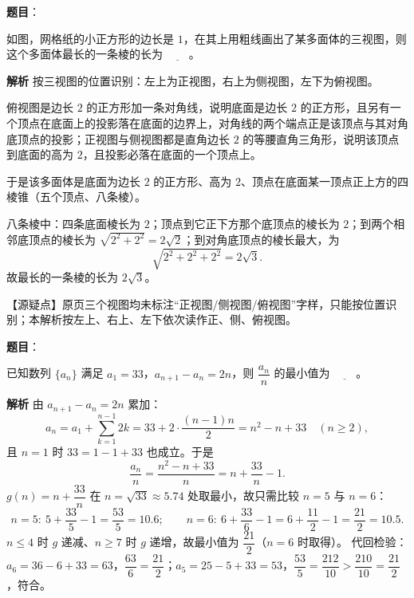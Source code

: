 \begin{answer}

\textbf{题目}：

如图，网格纸的小正方形的边长是 $1$，在其上用粗线画出了某多面体的三视图，则这个多面体最长的一条棱的长为 $\underline{\qquad}$。
\nopagebreak[4]
\begin{center}\end{center}
\nopagebreak[4]
\textbf{解析}
按三视图的位置识别：左上为正视图，右上为侧视图，左下为俯视图。

俯视图是边长 $2$ 的正方形加一条对角线，说明底面是边长 $2$ 的正方形，且另有一个顶点在底面上的投影落在底面的边界上，对角线的两个端点正是该顶点与其对角底顶点的投影；正视图与侧视图都是直角边长 $2$ 的等腰直角三角形，说明该顶点到底面的高为 $2$，且投影必落在底面的一个顶点上。

于是该多面体是底面为边长 $2$ 的正方形、高为 $2$、顶点在底面某一顶点正上方的四棱锥（五个顶点、八条棱）。

八条棱中：四条底面棱长为 $2$；顶点到它正下方那个底顶点的棱长为 $2$；到两个相邻底顶点的棱长为 $\sqrt{2^2+2^2}=2\sqrt2$；到对角底顶点的棱长最大，为
\nopagebreak[4]
\[\sqrt{2^2+2^2+2^2}=2\sqrt3.\]
故最长的一条棱的长为 $2\sqrt3$。

【源疑点】原页三个视图均未标注“正视图/侧视图/俯视图”字样，只能按位置识别；本解析按左上、右上、左下依次读作正、侧、俯视图。


\end{answer}
\begin{answer}

\textbf{题目}：

已知数列 $\{a_n\}$ 满足 $a_1=33$，$a_{n+1}-a_n=2n$，则 $\dfrac{a_n}{n}$ 的最小值为 $\underline{\qquad}$。

\textbf{解析}
由 $a_{n+1}-a_n=2n$ 累加：
\nopagebreak[4]
\[a_n=a_1+\sum_{k=1}^{n-1}2k=33+2\cdot\frac{(n-1)n}{2}=n^2-n+33\quad(n\geqslant2),\]
且 $n=1$ 时 $33=1-1+33$ 也成立。于是
\nopagebreak[4]
\[\frac{a_n}{n}=\frac{n^2-n+33}{n}=n+\frac{33}{n}-1.\]
$g(n)=n+\dfrac{33}{n}$ 在 $n=\sqrt{33}\approx5.74$ 处取最小，故只需比较 $n=5$ 与 $n=6$：
\nopagebreak[4]
\[n=5:\ 5+\frac{33}{5}-1=\frac{53}{5}=10.6;\qquad
n=6:\ 6+\frac{33}{6}-1=6+\frac{11}{2}-1=\frac{21}{2}=10.5.\]
$n\leqslant4$ 时 $g$ 递减、$n\geqslant7$ 时 $g$ 递增，故最小值为 $\dfrac{21}{2}$（$n=6$ 时取得）。
代回检验：$a_6=36-6+33=63$，$\dfrac{63}{6}=\dfrac{21}{2}$；$a_5=25-5+33=53$，$\dfrac{53}{5}=\dfrac{212}{10}>\dfrac{210}{10}=\dfrac{21}{2}$，符合。


\end{answer}
